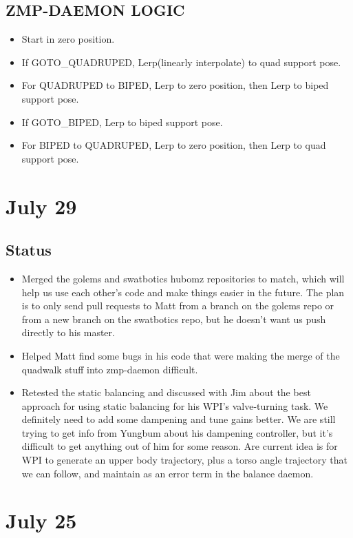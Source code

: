 \documentclass[letterpaper, 10 pt]{report}
\begin{document}
\subsection*{ZMP-DAEMON LOGIC}
\begin{itemize}
\item Start in zero position.
\item If GOTO\_QUADRUPED, Lerp(linearly interpolate) to quad support pose.
\item For QUADRUPED to BIPED, Lerp to zero position, then Lerp to biped support pose.
\item If GOTO\_BIPED, Lerp to biped support pose.
\item For BIPED to QUADRUPED, Lerp to zero position, then Lerp to quad support pose.
\end{itemize}

\section*{July 29}
\subsection*{Status}
\begin{itemize}
\item Merged the golems and swatbotics hubomz repositories to match, which will help us use each other's code and make things easier in the future. The plan is to only send pull requests to Matt from a branch on the golems repo or from a new branch on the swatbotics repo, but he doesn't want us push directly to his master.
\item Helped Matt find some bugs in his code that were making the merge of the quadwalk stuff into zmp-daemon difficult.
\item Retested the static balancing and discussed with Jim about the best approach for using static balancing for his WPI's valve-turning task. We definitely need to add some dampening and tune gains better. We are still trying to get info from Yungbum about his dampening controller, but it's difficult to get anything out of him for some reason. Are current idea is for WPI to generate an upper body trajectory, plus a torso angle trajectory that we can follow, and maintain as an error term in the balance daemon.
\end{itemize}

\section*{July 25}
\end{document}
